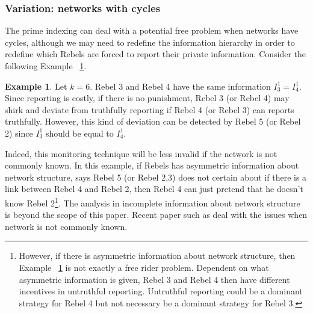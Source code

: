 \documentclass[12pt,letter]{article}
\theoremstyle{definition}
\newtheorem{example}{Example}[section]
\theoremstyle{remark}
\theoremstyle{claim}
\begin{document}
\subsubsection{Variation: networks with cycles}

The prime indexing can deal with a potential free problem when networks have cycles, although we may need to redefine the information hierarchy in order to redefine which Rebels are forced to report their private information. Consider the following Example ~\ref{ex_no_free_rider_cycle}.

\begin{example}
\label{ex_no_free_rider_cycle}
Let $k=6$. Rebel 3 and Rebel 4 have the same information $I^1_3=I^1_4$. Since reporting is costly, if there is no punishment, Rebel 3 (or Rebel 4) may shirk and deviate from truthfully reporting if Rebel 4 (or Rebel 3) can reports truthfully. However, this kind of deviation can be detected by Rebel 5 (or Rebel 2) since $I^1_3$ should be equal to $I^1_4$. 

\begin{center}
\end{center}

\end{example}

Indeed, this monitoring technique will be less invalid if the network is not commonly known. In this example, if Rebels has asymmetric information about network structure, says Rebel 5 (or Rebel 2,3) does not certain about if there is a link between Rebel 4 and Rebel 2, then Rebel 4 can just pretend that he doesn't know Rebel 2\footnote{However, if there is asymmetric information about network structure, then Example ~\ref{ex_no_free_rider_cycle} is not exactly a free rider problem. Dependent on what asymmetric information is given, Rebel 3 and Rebel 4 then have different incentives in untruthful reporting. Untruthful reporting could be a dominant strategy for Rebel 4 but not necessary be a dominant strategy for Rebel 3.}. The analysis in incomplete information about network structure is beyond the scope of this paper. Recent paper such as \citep{Galeotti2010} deal with the issues when network is not commonly known.
\end{document}
